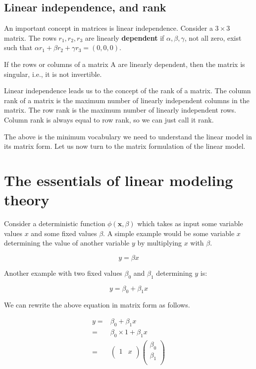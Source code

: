 \documentclass[12pt,]{krantz}
\begin{document}
\hypertarget{linear-independence-and-rank}{%
\subsection{Linear independence, and rank}\label{linear-independence-and-rank}}

An important concept in matrices is linear independence. Consider a \(3\times 3\) matrix.
The rows \(r_1, r_2, r_3\) are linearly \textbf{dependent} if
\(\alpha, \beta, \gamma\), not all zero, exist such that
\(\alpha r_1+ \beta r_2+ \gamma r_3 = (0,0,0)\).

If the rows or columns of a matrix A are linearly dependent, then the matrix is singular, i.e., it is not invertible.

Linear independence leads us to the concept of the rank of a matrix.
The column rank of a matrix is the maximum number of linearly independent columns in the matrix. The row rank is the maximum number of linearly independent rows. Column rank is always equal to row rank, so we can just call it rank.

The above is the minimum vocabulary we need to understand the linear model in its matrix form. Let us now turn to the matrix formulation of the linear model.

\hypertarget{the-essentials-of-linear-modeling-theory}{%
\section{The essentials of linear modeling theory}\label{the-essentials-of-linear-modeling-theory}}

Consider a deterministic function \(\phi(\mathbf{x},\beta)\) which takes as input some variable values \(x\) and some fixed values \(\beta\). A simple example would be some variable \(x\) determining the value of another variable \(y\) by multiplying \(x\) with \(\beta\).

\begin{equation}
y = \beta x
\end{equation}

Another example with two fixed values \(\beta_0\) and \(\beta_1\) determining \(y\) is:

\begin{equation}
y = \beta_0 + \beta_1 x
\end{equation}

We can rewrite the above equation in matrix form as follows.

\begin{equation}
\begin{split}
y=& \beta_0 + \beta_1 x\\
=& \beta_0\times 1 + \beta_1 x\\
=& \begin{pmatrix}
1 & x\\
\end{pmatrix}
\begin{pmatrix}
\beta_0 \\
\beta_1 \\
\end{pmatrix}
\end{split}
\end{equation}
\end{document}

